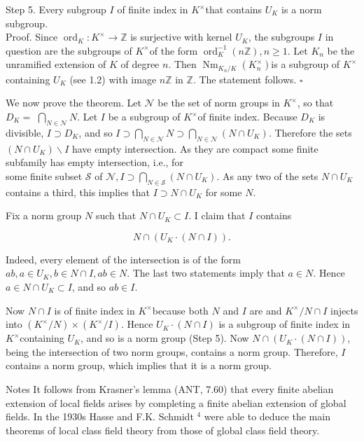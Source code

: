 \documentclass[10pt]{article}
\begin{document}
Step 5. Every subgroup $I$ of finite index in $K^{\times}$that contains $U_{K}$ is a norm subgroup.\\
Proof. Since $\operatorname{ord}_{K}: K^{\times} \rightarrow \mathbb{Z}$ is surjective with kernel $U_{K}$, the subgroups $I$ in question are the subgroups of $K^{\times}$of the form $\operatorname{ord}_{K}^{-1}(n \mathbb{Z}), n \geq 1$. Let $K_{n}$ be the unramified extension of $K$ of degree $n$. Then $\operatorname{Nm}_{K_{n} / K}\left(K_{n}^{\times}\right)$is a subgroup of $K^{\times}$containing $U_{K}$ (see 1.2) with image $n \mathbb{Z}$ in $\mathbb{Z}$. The statement follows. \(\square\)

We now prove the theorem. Let $\mathcal{N}$ be the set of norm groups in $K^{\times}$, so that $D_{K}=$ $\bigcap_{N \in \mathcal{N}} N$. Let $I$ be a subgroup of $K^{\times}$of finite index. Because $D_{K}$ is divisible, $I \supset D_{K}$, and so $I \supset \bigcap_{N \in \mathcal{N}} N \supset \bigcap_{N \in \mathcal{N}}\left(N \cap U_{K}\right)$. Therefore the sets $\left(N \cap U_{K}\right) \backslash I$ have empty intersection. As they are compact some finite subfamily has empty intersection, i.e., for\\
some finite subset $\mathcal{S}$ of $\mathcal{N}, I \supset \bigcap_{N \in \mathcal{S}}\left(N \cap U_{K}\right)$. As any two of the sets $N \cap U_{K}$ contains a third, this implies that $I \supset N \cap U_{K}$ for some $N$.

Fix a norm group $N$ such that $N \cap U_{K} \subset I$. I claim that $I$ contains

$$
N \cap\left(U_{K} \cdot(N \cap I)\right) .
$$

Indeed, every element of the intersection is of the form $a b, a \in U_{K}, b \in N \cap I, a b \in N$. The last two statements imply that $a \in N$. Hence $a \in N \cap U_{K} \subset I$, and so $a b \in I$.

Now $N \cap I$ is of finite index in $K^{\times}$because both $N$ and $I$ are and $K^{\times} / N \cap I$ injects into $\left(K^{\times} / N\right) \times\left(K^{\times} / I\right)$. Hence $U_{K} \cdot(N \cap I)$ is a subgroup of finite index in $K^{\times}$containing $U_{K}$, and so is a norm group (Step 5). Now $N \cap\left(U_{K} \cdot(N \cap I)\right)$, being the intersection of two norm groups, contains a norm group. Therefore, $I$ contains a norm group, which implies that it is a norm group.

Notes It follows from Krasner's lemma (ANT, 7.60) that every finite abelian extension of local fields arises by completing a finite abelian extension of global fields. In the 1930s Hasse and F.K. Schmidt ${ }^{4}$ were able to deduce the main theorems of local class field theory from those of global class field theory.
\end{document}
